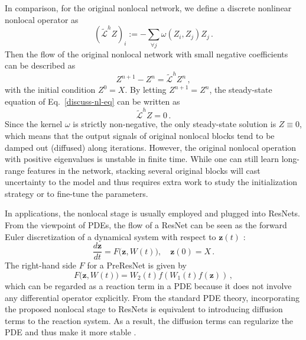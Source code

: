 \documentclass{article}
\newcommand{\zb}{\bm{z}}
\begin{document}
In comparison, for the original nonlocal network, we define a discrete nonlinear nonlocal operator as
\begin{equation}\label{nl-op-2}
(\mathcal{\tilde{L}}^h Z)_i:= -\sum_{\forall j} \omega(Z_i,Z_j)Z_j\,.
\end{equation}
Then the flow of the original nonlocal network with small negative coefficients can be described as
\begin{equation}\label{discuss-nl-eq}
Z^{n+1} - Z^n = \mathcal{\tilde{L}}^h Z^n\,,
\end{equation}
with the initial condition $Z^0=X$. By letting $Z^{n+1}=Z^n$, the steady-state equation of Eq.~\eqref{discuss-nl-eq} can be written as
\begin{equation}
\mathcal{\tilde{L}}^hZ = 0\,.
\end{equation}
Since the kernel $\omega$ is strictly non-negative, the only steady-state solution is $Z\equiv 0$, which means that the output signals of original nonlocal blocks tend to be damped out (diffused) along iterations. However, 
 the original nonlocal operation with positive eigenvalues is unstable in finite time. While one can still learn long-range features in the network, stacking several original blocks will cast uncertainty to the model and thus requires extra work to study the initialization strategy or to fine-tune the parameters.

In applications, the nonlocal stage is usually employed and plugged into ResNets. From the viewpoint of PDEs, the flow of a ResNet can be seen as the forward Euler discretization of a dynamical system with respect to $\zb(t)$ \cite{weinan2017proposal}:
\begin{equation}\label{resnet-ds}
\frac{d\zb}{dt} = F\big(\zb, W(t)\big), \quad \zb(0) = X\,.
\end{equation}
The right-hand side $F$ for a PreResNet is given by
\begin{equation}
F\big(\zb,W(t)\big) = W_2(t) f \left (W_1(t) f(\zb) \right)\,,
\end{equation}
which can be regarded as a reaction term in a PDE because it does not involve any differential operator explicitly. From the standard PDE theory, incorporating the proposed nonlocal stage to ResNets is equivalent to introducing diffusion terms to the reaction system. As a result, the diffusion terms can regularize the PDE and thus make it more stable \cite{evans1997partial}.
\end{document}
